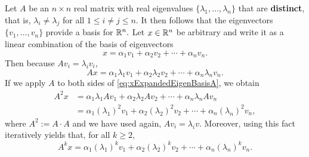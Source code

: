 \documentclass[letterpaper]{book}
\begin{document}
\begin{tcolorbox}[sharp corners, colback=green!30, colframe=green!80!blue, title=\textcolor{red}{\Large \bf Utility of Eigenvalues and Eigenvectors:} \textbf{\Large They Explain how a Square Matrix acts on a Vector}]
Let $A$ be an $n \times n$ real matrix with real eigenvalues $\{ \lambda_1,\ldots, \lambda_n \}$ that are \textbf{distinct}, that is, $\lambda_i \neq \lambda_j $ for all $1 \le i \neq j \le n$. It then follows that the eigenvectors $\{ v_1,\ldots,v_n \}$ provide a basis for $\mathbb R^n.$ Let $x\in \mathbb R^n$ be arbitrary and write it as a linear combination of the basis of eigenvectors
\begin{equation}
    \label{eq:xExpandedEigenBasis}
    x = \alpha_ 1 v_1 + \alpha_2 v_2 + \cdots + \alpha_n v_n.
\end{equation}
Then because $Av_i = \lambda_i v_i$,
\begin{equation}
    \label{eq:xExpandedEigenBasisA}
   A x = \alpha_ 1 \lambda_1 v_1 + \alpha_2 \lambda_2 v_2 + \cdots +\alpha_n  \lambda_n v_n.
\end{equation}
If we apply $A$ to both sides of \eqref{eq:xExpandedEigenBasisA}, we obtain
\begin{equation}
    \label{eq:xExpandedEigenBasisA2}
    \begin{aligned}
       A^2 x &= \alpha_ 1 \lambda_1 A v_1 + \alpha_2 \lambda_2 A v_2 + \cdots +\alpha_n  \lambda_n Av_n \\
       &= \alpha_ 1 (\lambda_1)^2 v_1 + \alpha_2 (\lambda_2)^2  v_2 + \cdots +\alpha_n  (\lambda_n)^2 v_n,
    \end{aligned}
\end{equation}
where $A^2:= A \cdot A$ and we have used again, $A v_i = \lambda_i v$. 
Moreover, using this fact iteratively yields that, for all $k \ge 2$,
\begin{equation}
    \label{eq:xExpandedEigenBasisB}
   A^k x = \alpha_ 1 (\lambda_1)^k v_1 + \alpha_2 (\lambda_2)^k v_2 + \cdots +\alpha_n  (\lambda_n)^k v_n.
\end{equation}

\end{tcolorbox}
\vspace*{.3cm}
\end{document}
